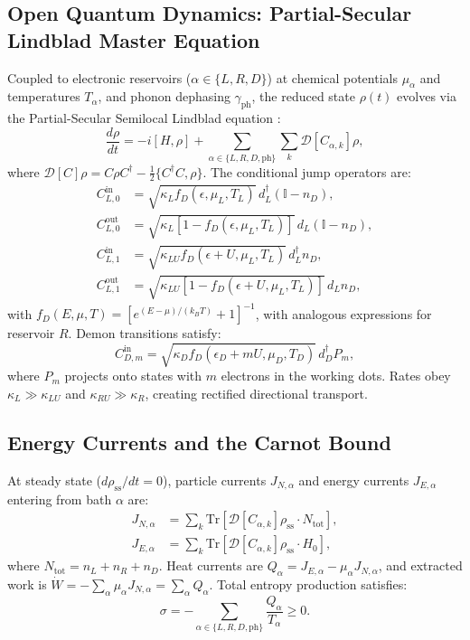 \documentclass[10pt,twocolumn,a4paper]{article}
\begin{document}
\subsection{Open Quantum Dynamics: Partial-Secular Lindblad Master Equation}
Coupled to electronic reservoirs ($\alpha \in \{L, R, D\}$) at chemical potentials $\mu_\alpha$ and temperatures $T_\alpha$, and phonon dephasing $\gamma_{\mathrm{ph}}$, the reduced state $\rho(t)$ evolves via the Partial-Secular Semilocal Lindblad equation \cite{schaller2014open, strasberg2017quantum}:
\begin{equation}
\frac{d\rho}{dt} = -i [H, \rho] + \sum_{\alpha \in \{L, R, D, \mathrm{ph}\}} \sum_k \mathcal{D}[C_{\alpha, k}]\rho,
\label{eq:lindblad_master}
\end{equation}
where $\mathcal{D}[C]\rho = C \rho C^\dagger - \frac{1}{2}\{C^\dagger C, \rho\}$. The conditional jump operators are:
\begin{align}
C_{L, 0}^{\mathrm{in}} &= \sqrt{\kappa_L f_D(\epsilon, \mu_L, T_L)}\, d_L^\dagger (\mathbb{I} - n_D), \\
C_{L, 0}^{\mathrm{out}} &= \sqrt{\kappa_L [1 - f_D(\epsilon, \mu_L, T_L)]}\, d_L (\mathbb{I} - n_D), \\
C_{L, 1}^{\mathrm{in}} &= \sqrt{\kappa_{LU} f_D(\epsilon + U, \mu_L, T_L)}\, d_L^\dagger n_D, \\
C_{L, 1}^{\mathrm{out}} &= \sqrt{\kappa_{LU} [1 - f_D(\epsilon + U, \mu_L, T_L)]}\, d_L n_D,
\end{align}
with $f_D(E, \mu, T) = [e^{(E - \mu)/(k_B T)} + 1]^{-1}$, with analogous expressions for reservoir $R$. Demon transitions satisfy:
\begin{equation}
C_{D, m}^{\mathrm{in}} = \sqrt{\kappa_D f_D(\epsilon_D + mU, \mu_D, T_D)}\, d_D^\dagger P_m,
\end{equation}
where $P_m$ projects onto states with $m$ electrons in the working dots. Rates obey $\kappa_L \gg \kappa_{LU}$ and $\kappa_{RU} \gg \kappa_R$, creating rectified directional transport.

\subsection{Energy Currents and the Carnot Bound}
At steady state ($d\rho_{\mathrm{ss}}/dt = 0$), particle currents $J_{N, \alpha}$ and energy currents $J_{E, \alpha}$ entering from bath $\alpha$ are:
\begin{align}
J_{N, \alpha} &= \sum_k \mathrm{Tr} \left[ \mathcal{D}[C_{\alpha, k}]\rho_{\mathrm{ss}} \cdot N_{\mathrm{tot}} \right], \\
J_{E, \alpha} &= \sum_k \mathrm{Tr} \left[ \mathcal{D}[C_{\alpha, k}]\rho_{\mathrm{ss}} \cdot H_0 \right],
\end{align}
where $N_{\mathrm{tot}} = n_L + n_R + n_D$. Heat currents are $Q_\alpha = J_{E, \alpha} - \mu_\alpha J_{N, \alpha}$, and extracted work is $\dot{W} = -\sum_\alpha \mu_\alpha J_{N, \alpha} = \sum_\alpha Q_\alpha$. Total entropy production satisfies:
\begin{equation}
\sigma = -\sum_{\alpha \in \{L, R, D, \mathrm{ph}\}} \frac{Q_\alpha}{T_\alpha} \ge 0.
\end{equation}
\end{document}
